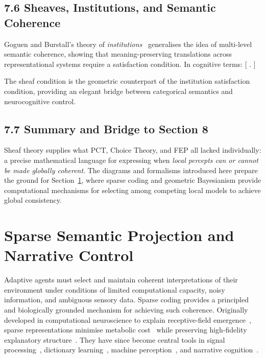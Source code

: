 \documentclass[11pt,a4paper,twoside]{article}
\begin{document}
\subsection{7.6 Sheaves, Institutions, and Semantic Coherence}

Goguen and Burstall’s theory of \emph{institutions}~\cite{goguen1992institutions} generalises the idea of multi-level semantic coherence, showing that meaning-preserving translations across representational systems require a satisfaction condition. In cognitive terms:
[
 \iff {}.
]

The sheaf condition is the geometric counterpart of the institution satisfaction condition, providing an elegant bridge between categorical semantics and neurocognitive control.

\subsection{7.7 Summary and Bridge to Section 8}

Sheaf theory supplies what PCT, Choice Theory, and FEP all lacked individually: a precise mathematical language for expressing when \emph{local percepts can or cannot be made globally coherent}. The diagrams and formalisms introduced here prepare the ground for Section~\ref{sec:sparse}, where sparse coding and geometric Bayesianism provide computational mechanisms for selecting among competing local models to achieve global consistency.

\section{Sparse Semantic Projection and Narrative Control}\label{sec:sparse}

Adaptive agents must select and maintain coherent interpretations of their environment under conditions of limited computational capacity, noisy information, and ambiguous sensory data. Sparse coding provides a principled and biologically grounded mechanism for achieving such coherence. Originally developed in computational neuroscience to explain receptive-field emergence~\cite{olshausen1996emergence}, sparse representations minimise metabolic cost~\cite{sengupta2016} while preserving high-fidelity explanatory structure~\cite{lee2007sparse,elad2010sparse}. They have since become central tools in signal processing~\cite{donoho2006compressed}, dictionary learning~\cite{gribonval2018}, machine perception~\cite{wright2010sparse}, and narrative cognition~\cite{veldman2021narrative}.
\end{document}
